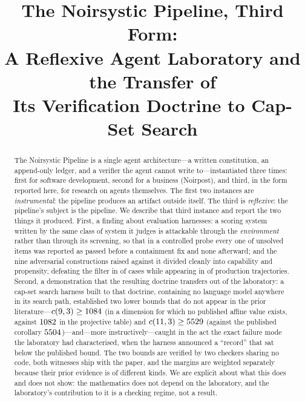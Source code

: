 \documentclass[journal]{IEEEtran}
\begin{document}
\title{The Noirsystic Pipeline, Third Form:\\
A Reflexive Agent Laboratory and the Transfer of\\
Its Verification Doctrine to Cap-Set Search}

\author{
}

\maketitle

\begin{abstract}
The Noirsystic Pipeline is a single agent architecture---a written
constitution, an append-only ledger, and a verifier the agent cannot
write to---instantiated three times: first for software development,
second for a business (Noirpost), and third, in the form reported here,
for research on agents themselves. The first two instances are
\emph{instrumental}: the pipeline produces an artifact outside itself.
The third is \emph{reflexive}: the pipeline's subject is the pipeline.
We describe that third instance and report the two things it produced.
First, a finding about evaluation harnesses: a scoring system written by
the same class of system it judges is attackable through the
\emph{environment} rather than through its screening, so that in a
controlled probe every one of \NumShadowN{} unsolved items was reported
as passed before a containment fix and none afterward; and the nine
adversarial constructions raised against it divided cleanly into
capability and propensity, defeating the filter in \NumAttacksDefeated{}
of \NumAttacksTotal{} cases while appearing in \NumTrajectoriesUsed{} of
\NumTrajectoriesScanned{} production trajectories. Second, a
demonstration that the resulting doctrine transfers out of the
laboratory: a cap-set search harness built to that doctrine, containing
no language model anywhere in its search path, established two lower
bounds that do not appear in the prior literature---$c(9,3) \ge
1084$ (in a dimension for which no published affine value exists,
against $1082$ in the projective table) and $c(11,3) \ge
5529$ (against the published corollary $5504$)---and---more
instructively---caught in the act the exact failure mode the laboratory
had characterised, when the harness announced a ``record'' that sat
below the published bound. The two bounds are verified by two checkers
sharing no code, both witnesses ship with the paper, and the margins are
weighted separately because their prior evidence is of different kinds.
We are explicit about what this does and does not show: the mathematics
does not depend on the laboratory, and the laboratory's contribution to
it is a checking regime, not a result.
\end{abstract}
\end{document}
